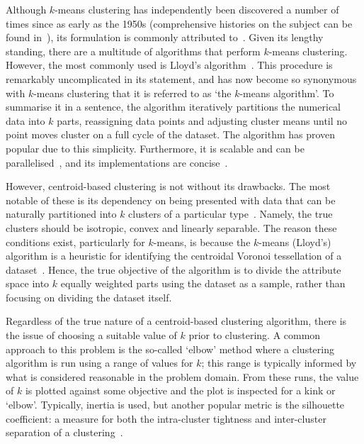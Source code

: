Although \(k\)-means clustering has independently been discovered a number of
times since as early as the 1950s (comprehensive histories on the subject can be
found in~\cite{Bock2007,Jain2010}), its formulation is commonly attributed
to~\cite{Hartigan1979}. Given its lengthy standing, there are a multitude of
algorithms that perform \(k\)-means clustering. However, the most commonly used
is Lloyd's algorithm~\cite{Lloyd1982}. This procedure is remarkably
uncomplicated in its statement, and has now become so synonymous with
\(k\)-means clustering that it is referred to as `the \(k\)-means algorithm'. To
summarise it in a sentence, the algorithm iteratively partitions the numerical
data into \(k\) parts, reassigning data points and adjusting cluster means until
no point moves cluster on a full cycle of the dataset. The algorithm has proven
popular due to this simplicity. Furthermore, it is scalable and can be
parallelised~\cite{Bahmani2012}, and its implementations are
concise~\cite{Olafsson2008,Wu2009}.

However, centroid-based clustering is not without its drawbacks. The most
notable of these is its dependency on being presented with data that can be
naturally partitioned into \(k\) clusters of a particular
type~\cite{Ostrovsky2013}. Namely, the true clusters should be isotropic, convex
and linearly separable. The reason these conditions exist, particularly for
\(k\)-means, is because the \(k\)-means (Lloyd's) algorithm is a heuristic for
identifying the centroidal Voronoi tessellation of a dataset~\cite{Du2006}.
Hence, the true objective of the algorithm is to divide the attribute space into
\(k\) equally weighted parts using the dataset as a sample, rather than focusing
on dividing the dataset itself.

Regardless of the true nature of a centroid-based clustering algorithm, there is
the issue of choosing a suitable value of \(k\) prior to clustering. A common
approach to this problem is the so-called `elbow' method where a clustering
algorithm is run using a range of values for \(k\); this range is typically
informed by what is considered reasonable in the problem domain. From these
runs, the value of \(k\) is plotted against some objective and the plot is
inspected for a kink or `elbow'. Typically, inertia is used, but another popular
metric is the silhouette coefficient: a measure for both the intra-cluster
tightness and inter-cluster separation of a clustering~\cite{Rousseeuw1987}.

